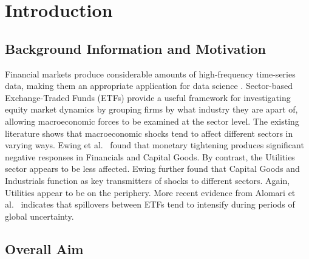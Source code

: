 \documentclass[12pt]{article}
\begin{document}
\newpage

\section{Introduction}

\subsection{Background Information and Motivation}

Financial markets produce considerable amounts of high-frequency time-series data, making them an appropriate application for data science \cite{cfadata2024}. Sector-based Exchange-Traded Funds (ETFs) provide a useful framework for investigating equity market dynamics by grouping firms by what industry they are apart of, allowing macroeconomic forces to be examined at the sector level. The existing literature shows that macroeconomic shocks tend to affect different sectors in varying ways. Ewing et al.\ \cite{ewing2003} found that monetary tightening produces significant negative responses in Financials and Capital Goods. By contrast, the Utilities sector appears to be less affected. Ewing \cite{ewing2002} further found that Capital Goods and Industrials function as key transmitters of shocks to different sectors. Again, Utilities appear to be on the periphery. More recent evidence from Alomari et al.\ \cite{alomari2024} indicates that spillovers between ETFs tend to intensify during periods of global uncertainty.

\vspace{0.5cm}


\subsection{Overall Aim}
\end{document}

